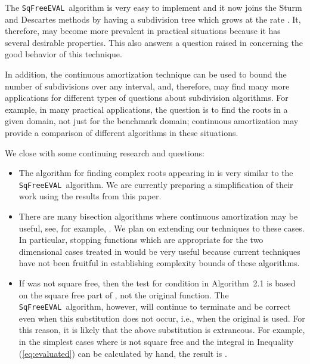 \documentclass{amsart}
\theoremstyle{definition}
\newcommand{\EVAL}{\texttt{SqFreeEVAL}}
\begin{document}
The \EVAL\ algorithm is very easy to implement \citep{moore:bk,mitchell:robust-ray:90,plantinga-vegter:isotopic:04,plantinga:thesis:06,kamath:subdivision:10} and it now joins the Sturm and Descartes methods by having a subdivision tree which grows at the rate .  It, therefore, may become more prevalent in practical situations because it has several desirable properties.  This also answers a question raised in \citep{Henrici:search:70} concerning the good behavior of this technique.

In addition, the continuous amortization technique can be used to bound the number of subdivisions over any interval, and, therefore, may find many more applications for different types of questions about subdivision algorithms.  For example, in many practical applications, the question is to find the roots in a given domain, not just for the benchmark domain; continuous amortization may provide a comparison of different algorithms in these situations.

We close with some continuing research and questions:
\begin{itemize}
\item The algorithm for finding complex roots appearing in \citep{sagraloff-yap:ceval:09} is very similar to the \EVAL\ algorithm. We are currently preparing a simplification of their work using the results from this paper.
\item There are many bisection algorithms where continuous amortization may be useful, see, for example, \citep{Henrici:search:70,Yakoubsohn:bisection:05,sagraloff-yap:ceval:09, plantinga-vegter:isotopic:04,plantinga:thesis:06,snyder:interval:92, galehouse:thesis,burr+3:subdiv2:10,eigenwillig-sharma-yap:descartes:06, du-sharma-yap:sturm:07,linyap2009}.  We plan on extending our techniques to these cases.  In particular, stopping functions which are appropriate for the two dimensional cases treated in \citep{plantinga-vegter:isotopic:04,plantinga:thesis:06,galehouse:thesis} would be very useful because current techniques have not been fruitful in establishing complexity bounds of these algorithms.
\item If  was not square free, then the test for condition  in Algorithm~2.1 is based on the square free part of , not the original function.  The \EVAL\ algorithm, however, will continue to terminate and be correct even when this substitution does not occur, i.e., when the original  is used.  For this reason, it is likely that the above substitution is extraneous.  For example, in the simplest cases where  is not square free and the integral in Inequality (\ref{eq:evaluated}) can be calculated by hand, the result is .
\end{itemize}



\end{document}

